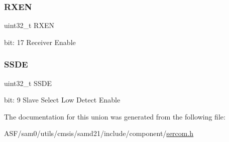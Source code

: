 \subsubsection{\texorpdfstring{RXEN}{RXEN}}
{\footnotesize\ttfamily uint32\+\_\+t R\+X\+EN}

bit\+: 17 Receiver Enable \mbox{\label{union_s_e_r_c_o_m___s_p_i___c_t_r_l_b___type_a7e822cdc42fd73e748479a932cb76f9d}} 
\subsubsection{\texorpdfstring{SSDE}{SSDE}}
{\footnotesize\ttfamily uint32\+\_\+t S\+S\+DE}

bit\+: 9 Slave Select Low Detect Enable 

The documentation for this union was generated from the following file\+:\begin{DoxyCompactItemize}
\item 
A\+S\+F/sam0/utils/cmsis/samd21/include/component/\mbox{\hyperlink{utils_2cmsis_2samd21_2include_2component_2sercom_8h}{sercom.\+h}}\end{DoxyCompactItemize}
